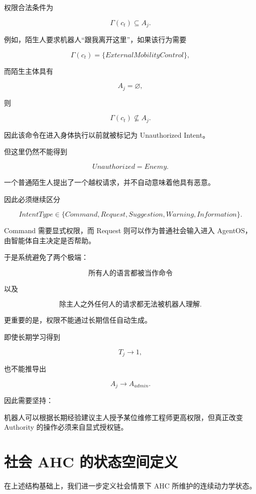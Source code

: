 权限合法条件为

\[
\boxed{
\Gamma(c_t)\subseteq A_j.
}
\]

例如，陌生人要求机器人“跟我离开这里”，如果该行为需要

\[
\Gamma(c_t)
=
\{
ExternalMobilityControl
\},
\]

而陌生主体具有

\[
A_j=\varnothing,
\]

则

\[
\Gamma(c_t)\not\subseteq A_j.
\]

因此该命令在进入身体执行以前就被标记为 Unauthorized Intent。

但这里仍然不能得到

\[
Unauthorized=Enemy.
\]

一个普通陌生人提出了一个越权请求，并不自动意味着他具有恶意。

因此必须继续区分

\[
IntentType
\in
\{
Command,
Request,
Suggestion,
Warning,
Information
\}.
\]

Command 需要显式权限，而 Request 则可以作为普通社会输入进入 AgentOS，由智能体自主决定是否帮助。

于是系统避免了两个极端：

\[
\text{所有人的语言都被当作命令}
\]

以及

\[
\text{除主人之外任何人的请求都无法被机器人理解}.
\]

更重要的是，权限不能通过长期信任自动生成。

即使长期学习得到

\[
T_j\rightarrow 1,
\]

也不能推导出

\[
A_j\rightarrow A_{admin}.
\]

因此需要坚持：

\begin{statementbox}
\centering
{}
\end{statementbox}

机器人可以根据长期经验建议主人授予某位维修工程师更高权限，但真正改变 Authority 的操作必须来自显式授权链。


\section{社会 AHC 的状态空间定义}

在上述结构基础上，我们进一步定义社会情景下 AHC 所维护的连续动力学状态。

